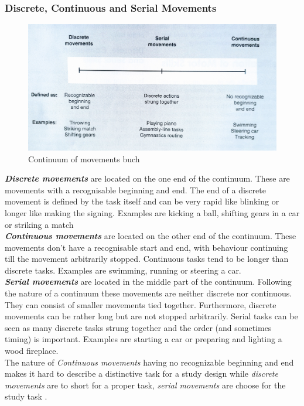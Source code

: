\subsubsection{Discrete, Continuous and Serial Movements}
\begin{figure}
	\centering
	\includegraphics[width=1.0\textwidth]{img/movements_cont.jpg}
	\caption{Continuum of movements buch \cite{Schmidt2011}}
	\label{fig:movements_cont}
\end{figure}
\textit{\textbf{Discrete movements}} are located on the one end of the continuum. These are movements with a recognisable beginning and end. The end of a discrete movement is defined by the task itself and can be very rapid like blinking or longer like making the signing. Examples are kicking a ball, shifting gears in a car or striking a match\\
\textit{\textbf{Continuous movements}} are located on the other end of the continuum. These movements don't have a recognisable start and end, with behaviour continuing till the movement arbitrarily stopped. Continuous tasks tend to be longer than discrete tasks. Examples are swimming, running or steering a car.\\
\textit{\textbf{Serial movements}} are located in the middle part of the continuum. Following the nature of a continuum these movements are neither discrete nor continuous. They can consist of smaller movements tied together. Furthermore, discrete movements can be rather long but are not stopped arbitrarily. Serial tasks can be seen as many discrete tasks strung together and the order (and sometimes timing) is important. Examples are starting a car or preparing and lighting a wood fireplace.\\
The nature of \textit{Continuous movements} having no recognizable beginning and end makes it hard to describe a distinctive task for a study design while \textit{discrete movements} are to short for a proper task, \textit{serial movements} are choose for the study task \markAthreeMovClass.

